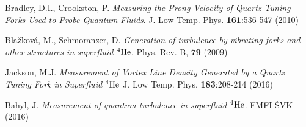 \begin{thebibliography}{99}
{\sc Bradley, D.I., Crookston, P.} 
\emph{Measuring the Prong Velocity of Quartz Tuning Forks Used to Probe Quantum Fluids}.
J. Low Temp. Phys. \textbf{161}:536-547 (2010)

{\sc Blažková, M., Schmoranzer, D.} 
\emph{Generation of turbulence by vibrating forks and other structures in superfluid $ {}^4\mathrm{He} $}.
Phys. Rev. B, \textbf{79} (2009)

{\sc Jackson, M.J.} 
\emph{Measurement of Vortex Line Density Generated by a Quartz Tuning Fork in Superfluid $ {}^4\mathrm{He} $}
J. Low Temp. Phys. \textbf{183}:208-214 (2016)

{\sc Bahyl, J.}
\emph{Measurement of quantum turbulence in superfluid $ {}^4\mathrm{He} $}.
FMFI ŠVK (2016)
	
	
	
\end{thebibliography}